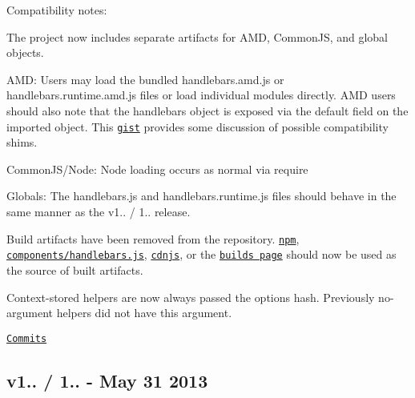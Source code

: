 Compatibility notes\+:
\begin{DoxyItemize}
\item The project now includes separate artifacts for A\+M\+D, Common\+J\+S, and global objects.
\begin{DoxyItemize}
\item A\+M\+D\+: Users may load the bundled {\ttfamily handlebars.\+amd.\+js} or {\ttfamily handlebars.\+runtime.\+amd.\+js} files or load individual modules directly. A\+M\+D users should also note that the handlebars object is exposed via the {\ttfamily default} field on the imported object. This \href{https://gist.github.com/wycats/7417be0dc361a69d5916}{\tt gist} provides some discussion of possible compatibility shims.
\item Common\+J\+S/\+Node\+: Node loading occurs as normal via {\ttfamily require}
\item Globals\+: The {\ttfamily handlebars.\+js} and {\ttfamily handlebars.\+runtime.\+js} files should behave in the same manner as the v1.. / 1.. release.
\end{DoxyItemize}
\item Build artifacts have been removed from the repository. \href{https://npmjs.org/package/handlebars}{\tt npm}, \href{https://github.com/components/handlebars.js}{\tt components/handlebars.\+js}, \href{http://cdnjs.com/libraries/handlebars.js/}{\tt cdnjs}, or the \href{http://builds.handlebarsjs.com.s3.amazonaws.com/index.html}{\tt builds page} should now be used as the source of built artifacts.
\item Context-\/stored helpers are now always passed the {\ttfamily options} hash. Previously no-\/argument helpers did not have this argument.
\end{DoxyItemize}

\href{https://github.com/wycats/handlebars.js/compare/v1.0.12...v1.1.0}{\tt Commits}

\subsection*{v1.. / 1.. -\/ May 31 2013}


